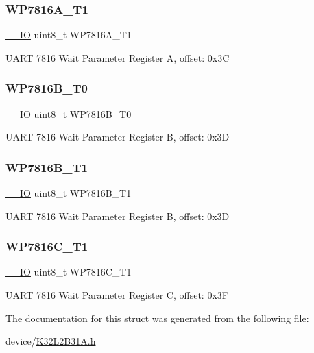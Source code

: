 \subsubsection{\texorpdfstring{WP7816A\_T1}{WP7816A\_T1}}
{\footnotesize\ttfamily \mbox{\hyperlink{core__cm0plus_8h_aec43007d9998a0a0e01faede4133d6be}{\+\_\+\+\_\+\+IO}} uint8\+\_\+t W\+P7816\+A\+\_\+\+T1}

U\+A\+RT 7816 Wait Parameter Register A, offset\+: 0x3C \mbox{\label{struct_u_a_r_t___type_a4ba4b47de6e555a63f00e1942c6a2d51}} 
\subsubsection{\texorpdfstring{WP7816B\_T0}{WP7816B\_T0}}
{\footnotesize\ttfamily \mbox{\hyperlink{core__cm0plus_8h_aec43007d9998a0a0e01faede4133d6be}{\+\_\+\+\_\+\+IO}} uint8\+\_\+t W\+P7816\+B\+\_\+\+T0}

U\+A\+RT 7816 Wait Parameter Register B, offset\+: 0x3D \mbox{\label{struct_u_a_r_t___type_a7e4f8b6d8a9eaabc87f8cd58a42c405c}} 
\subsubsection{\texorpdfstring{WP7816B\_T1}{WP7816B\_T1}}
{\footnotesize\ttfamily \mbox{\hyperlink{core__cm0plus_8h_aec43007d9998a0a0e01faede4133d6be}{\+\_\+\+\_\+\+IO}} uint8\+\_\+t W\+P7816\+B\+\_\+\+T1}

U\+A\+RT 7816 Wait Parameter Register B, offset\+: 0x3D \mbox{\label{struct_u_a_r_t___type_aeff609af3ee2afab66a1519100036439}} 
\subsubsection{\texorpdfstring{WP7816C\_T1}{WP7816C\_T1}}
{\footnotesize\ttfamily \mbox{\hyperlink{core__cm0plus_8h_aec43007d9998a0a0e01faede4133d6be}{\+\_\+\+\_\+\+IO}} uint8\+\_\+t W\+P7816\+C\+\_\+\+T1}

U\+A\+RT 7816 Wait Parameter Register C, offset\+: 0x3F 

The documentation for this struct was generated from the following file\+:\begin{DoxyCompactItemize}
\item 
device/\mbox{\hyperlink{_k32_l2_b31_a_8h}{K32\+L2\+B31\+A.\+h}}\end{DoxyCompactItemize}
